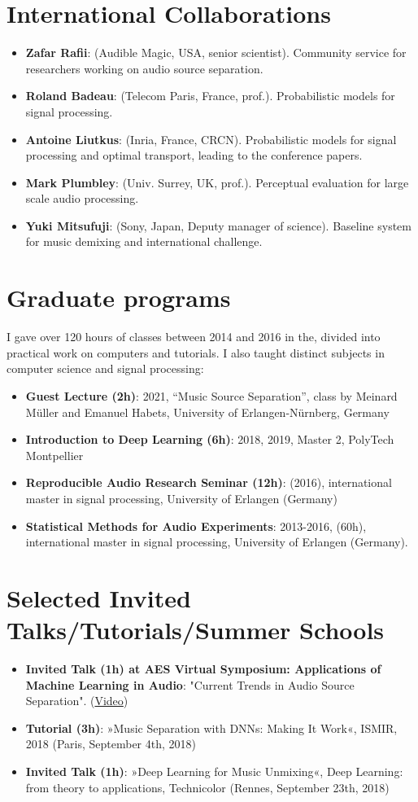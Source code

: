 \documentclass[a4paper,11pt]{article}
\newcommand{\resumeItem}[2]{
  \item\small{
    \textbf{#1}{: #2 \vspace{-2pt}}
  }
}
\newcommand{\resumeSubItem}[2]{\resumeItem{#1}{#2}\vspace{-4pt}}
\newcommand{\resumeSubHeadingListStart}{\begin{itemize}[leftmargin=*]}
\newcommand{\resumeSubHeadingListEnd}{\end{itemize}}
\begin{document}
\section{International Collaborations}
\resumeSubHeadingListStart
  \resumeSubItem{Zafar Rafii}{(Audible Magic, USA, senior scientist). Community service for researchers working on audio source separation.}
  \resumeSubItem{Roland Badeau}{(Telecom Paris, France, prof.). Probabilistic models for signal processing.}
  \resumeSubItem{Antoine Liutkus}{(Inria, France, CRCN). Probabilistic models for signal processing and optimal transport, leading to the conference papers.}
  \resumeSubItem{Mark Plumbley}{(Univ. Surrey, UK, prof.). Perceptual evaluation for large scale audio processing.}
  \resumeSubItem{Yuki Mitsufuji}{(Sony, Japan, Deputy manager of science). Baseline system for music demixing and international challenge.}
\resumeSubHeadingListEnd

\section{Graduate programs}
 I gave over 120 hours of classes between 2014 and 2016 in the, divided into practical work on computers and tutorials. I also taught distinct subjects in computer science and signal processing:
\resumeSubHeadingListStart
 \resumeSubItem{Guest Lecture (2h)}{2021, ``Music Source Separation'', class by Meinard Müller and Emanuel Habets, University of Erlangen-Nürnberg, Germany}
 \resumeSubItem{Introduction to Deep Learning (6h)}{2018, 2019, Master 2, PolyTech Montpellier}
 \resumeSubItem{Reproducible Audio Research Seminar (12h)}{(2016), international master in signal processing, University of Erlangen (Germany)}
 \resumeSubItem{Statistical Methods for Audio Experiments}{2013-2016, (60h), international master in signal processing, University of Erlangen (Germany).}
\resumeSubHeadingListEnd

\section{Selected Invited Talks/Tutorials/Summer Schools}
  \resumeSubHeadingListStart
    \resumeSubItem{Invited Talk (1h) at AES Virtual Symposium: Applications of Machine Learning in Audio}{
       "Current Trends in Audio Source Separation". (\href{https://www.youtube.com/watch?v=AB-F2JmI9U4}{Video})}
    \resumeSubItem{Tutorial (3h)}
       {»Music Separation with DNNs: Making It Work«, ISMIR, 2018 (Paris, September 4th, 2018)}
    \resumeSubItem{Invited Talk (1h)}
    {»Deep Learning for Music Unmixing«, Deep Learning: from
      theory to applications, Technicolor (Rennes, September 23th, 2018)}
  \resumeSubHeadingListEnd
\end{document}
